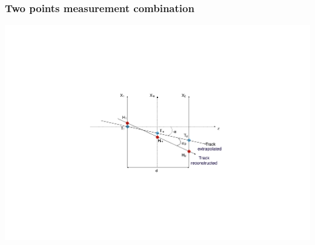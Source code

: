 \documentclass{beamer}
\begin{document}
\begin{frame}[plain]
    \frametitle{Two points measurement combination}

    \begin{center}
        \includegraphics[width = 9 cm]{Pictures/mini_vectors.pdf}
    \end{center}
\end{frame}
\end{document}

